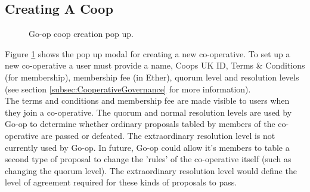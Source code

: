 \subsection{Creating A Coop}

\begin{figure}
\centering
{}
\decoRule
\caption[Go-op New Coop Pop Up]{Go-op coop creation pop up.}
\label{fig:createcooppage}
\end{figure}

Figure \ref{fig:createcooppage} shows the pop up modal for creating a new co-operative. To set up a new co-operative a user must provide a name, Coops UK ID, Terms \& Conditions (for membership), membership fee (in Ether), quorum level and resolution levels (see section \ref{subsec:CooperativeGovernance} for more information).\\

The terms and conditions and membership fee are made visible to users when they join a co-operative. The quorum and normal resolution levels are used by Go-op to determine whether ordinary proposals tabled by members of the co-operative are passed or defeated. The extraordinary resolution level is not currently used by Go-op. In future, Go-op could allow it's members to table a second type of proposal to change the 'rules' of the co-operative itself (such as changing the quorum level). The extraordinary resolution level would define the level of agreement required for these kinds of proposals to pass. \\

